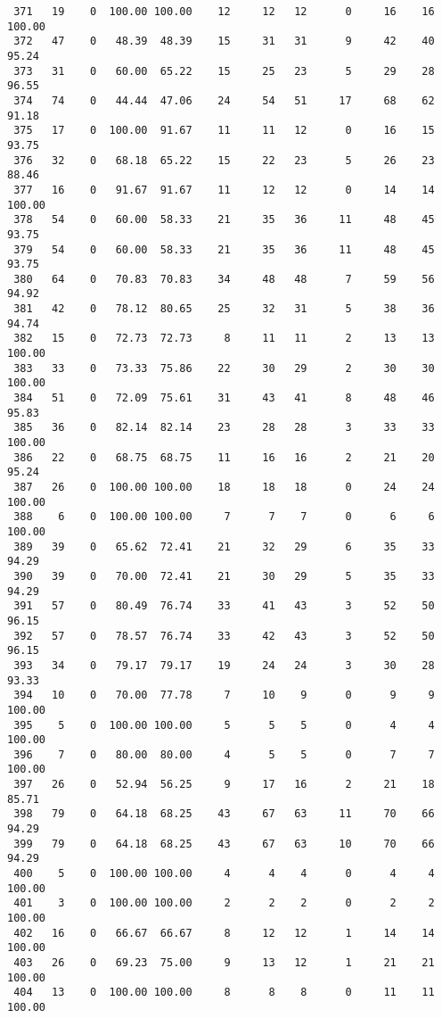 \begin{verbatim}
 371   19    0  100.00 100.00    12     12   12      0     16    16   100.00
 372   47    0   48.39  48.39    15     31   31      9     42    40    95.24
 373   31    0   60.00  65.22    15     25   23      5     29    28    96.55
 374   74    0   44.44  47.06    24     54   51     17     68    62    91.18
 375   17    0  100.00  91.67    11     11   12      0     16    15    93.75
 376   32    0   68.18  65.22    15     22   23      5     26    23    88.46
 377   16    0   91.67  91.67    11     12   12      0     14    14   100.00
 378   54    0   60.00  58.33    21     35   36     11     48    45    93.75
 379   54    0   60.00  58.33    21     35   36     11     48    45    93.75
 380   64    0   70.83  70.83    34     48   48      7     59    56    94.92
 381   42    0   78.12  80.65    25     32   31      5     38    36    94.74
 382   15    0   72.73  72.73     8     11   11      2     13    13   100.00
 383   33    0   73.33  75.86    22     30   29      2     30    30   100.00
 384   51    0   72.09  75.61    31     43   41      8     48    46    95.83
 385   36    0   82.14  82.14    23     28   28      3     33    33   100.00
 386   22    0   68.75  68.75    11     16   16      2     21    20    95.24
 387   26    0  100.00 100.00    18     18   18      0     24    24   100.00
 388    6    0  100.00 100.00     7      7    7      0      6     6   100.00
 389   39    0   65.62  72.41    21     32   29      6     35    33    94.29
 390   39    0   70.00  72.41    21     30   29      5     35    33    94.29
 391   57    0   80.49  76.74    33     41   43      3     52    50    96.15
 392   57    0   78.57  76.74    33     42   43      3     52    50    96.15
 393   34    0   79.17  79.17    19     24   24      3     30    28    93.33
 394   10    0   70.00  77.78     7     10    9      0      9     9   100.00
 395    5    0  100.00 100.00     5      5    5      0      4     4   100.00
 396    7    0   80.00  80.00     4      5    5      0      7     7   100.00
 397   26    0   52.94  56.25     9     17   16      2     21    18    85.71
 398   79    0   64.18  68.25    43     67   63     11     70    66    94.29
 399   79    0   64.18  68.25    43     67   63     10     70    66    94.29
 400    5    0  100.00 100.00     4      4    4      0      4     4   100.00
 401    3    0  100.00 100.00     2      2    2      0      2     2   100.00
 402   16    0   66.67  66.67     8     12   12      1     14    14   100.00
 403   26    0   69.23  75.00     9     13   12      1     21    21   100.00
 404   13    0  100.00 100.00     8      8    8      0     11    11   100.00

\end{verbatim}
